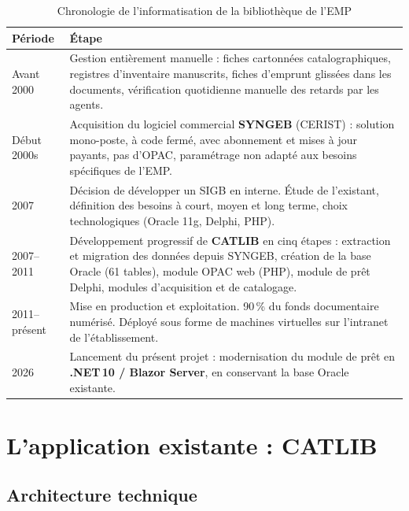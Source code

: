 \begin{table}[H]
\centering
\caption{Chronologie de l'informatisation de la bibliothèque de l'EMP}
\label{tab:historique}
\renewcommand{\arraystretch}{1.45}
\begin{tabular}{|p{2.6cm}|p{10.5cm}|}
\hline

\textbf{Période} & \textbf{Étape} \\
\hline
Avant 2000 &
Gestion entièrement manuelle : fiches cartonnées catalographiques, registres
d'inventaire manuscrits, fiches d'emprunt glissées dans les documents,
vérification quotidienne manuelle des retards par les agents. \\
\hline
Début 2000s &
Acquisition du logiciel commercial \textbf{SYNGEB} (CERIST) : solution
mono-poste, à code fermé, avec abonnement et mises à jour payants, pas
d'OPAC, paramétrage non adapté aux besoins spécifiques de l'EMP. \\
\hline
2007 &
Décision de développer un SIGB en interne. Étude de l'existant, définition
des besoins à court, moyen et long terme, choix technologiques (Oracle 11g,
Delphi, PHP). \\
\hline
2007–2011 &
Développement progressif de \textbf{CATLIB} en cinq étapes : extraction et
migration des données depuis SYNGEB, création de la base Oracle (61 tables),
module OPAC web (PHP), module de prêt Delphi, modules d'acquisition et de
catalogage. \\
\hline
2011–présent &
Mise en production et exploitation. 90\,\% du fonds documentaire numérisé.
Déployé sous forme de machines virtuelles sur l'intranet de l'établissement. \\
\hline
2026 &
Lancement du présent projet : modernisation du module de prêt en
\textbf{.NET\,10 / Blazor Server}, en conservant la base Oracle existante. \\
\hline
\end{tabular}
\end{table}

\FloatBarrier

\section{L'application existante : CATLIB}

\subsection{Architecture technique}

